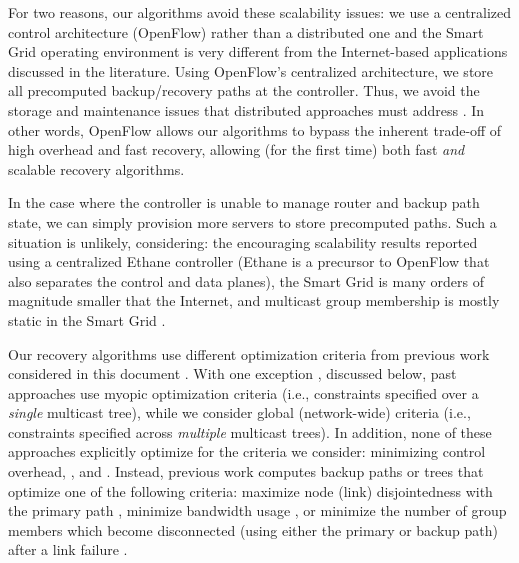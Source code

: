 For two reasons, our algorithms avoid these scalability issues: we use a centralized control architecture (OpenFlow) rather than a distributed one
and the Smart Grid operating environment is very different from the Internet-based applications discussed in the literature.
Using OpenFlow's centralized architecture, we store all precomputed backup/recovery paths at the controller.  
Thus, we avoid the storage and maintenance issues that distributed approaches must address  \cite{Cui04,Fei01,Pointurier02,Wu97}.
In other words, OpenFlow allows our algorithms to bypass the inherent trade-off of high overhead and fast recovery, allowing (for the first time) both fast \emph{and} scalable recovery algorithms.

In the case where the controller is unable to manage router and backup path state, we can simply provision more servers to store precomputed paths.  
Such a situation is unlikely, considering: the encouraging scalability results reported using a centralized Ethane controller \cite{Ethane07} 
(Ethane is a precursor to OpenFlow that also separates the control and data planes), the Smart Grid is many orders of
magnitude smaller that the Internet, and multicast group membership is mostly static in the Smart Grid \cite{Bakken11}.

Our recovery algorithms use different optimization criteria from previous work considered in this document \cite{Cui04,Fei01,Medard99,Pointurier02,Wu97}. 
With one exception \cite{Li06}, discussed below, past approaches use myopic optimization criteria (i.e., constraints specified over a \emph{single} multicast tree), while we consider global (network-wide)
criteria (i.e., constraints specified across \emph{multiple} multicast trees).  In addition, none of these approaches explicitly optimize for the criteria we consider: minimizing control overhead, 
, and .
Instead, previous work computes backup paths or trees that optimize one of the following criteria: maximize node (link) disjointedness with the primary 
path \cite{Cui04,Fei01, Medard99}, minimize bandwidth usage \cite{Wu97}, or minimize the number of group members which become disconnected (using either the primary
or backup path) after a link failure \cite{Pointurier02}.


